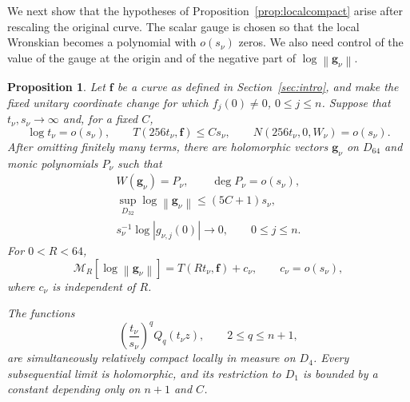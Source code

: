 \documentclass[12pt,letterpaper,reqno]{amsart}
\newtheorem{prop}[thm]{Proposition}
\theoremstyle{definition}
\numberwithin{equation}{section}
\newcommand{\NN}{N}
\newcommand{\mean}[2]{\mathcal M_{#1}\!\left[#2\right]}
\newcommand{\norm}[1]{\left\lVert#1\right\rVert}
\newcommand{\fv}{\bm f}
\newcommand{\gv}{\bm g}
\begin{document}
We next show that the hypotheses of
Proposition~\ref{prop:localcompact} arise after rescaling the original
curve. The scalar gauge is chosen so that the local Wronskian becomes a
polynomial with \(o(s_\nu)\) zeros. We also need control of the value
of the gauge at the origin and of the negative part of
\(\log\norm{\gv_\nu}\).

\begin{prop}\label{prop:representation}
Let \(\fv\) be a curve as defined in Section~\ref{sec:intro}, and make
the fixed unitary coordinate change for which
\(f_j(0)\ne0\), \(0\leq j\leq n\).
Suppose that \(t_\nu,s_\nu\to\infty\) and, for a fixed \(C\),
\begin{equation}\label{eq:scalehyp}
 \log t_\nu=o(s_\nu),
 \qquad
 T(256t_\nu,\fv)\leq Cs_\nu,
 \qquad
 \NN(256t_\nu,0,W_\nu)=o(s_\nu).
\end{equation}
After omitting finitely many terms, there are holomorphic vectors
\(\gv_\nu\) on \(D_{64}\) and monic polynomials \(P_\nu\) such that
\begin{equation}\label{eq:representationbounds}
 \begin{gathered}
 W(\gv_\nu)=P_\nu,
 \qquad
 \deg P_\nu=o(s_\nu),\\
 \sup_{D_{32}}\log\norm{\gv_\nu}
 \leq(5C+1)s_\nu,\\
 s_\nu^{-1}\log|g_{\nu,j}(0)|
 \longrightarrow0,
 \qquad
 0\leq j\leq n.
 \end{gathered}
\end{equation}
For \(0<R<64\),
\begin{equation}\label{eq:meanidentity}
 \mean R{\log\norm{\gv_\nu}}
 =
 T(Rt_\nu,\fv)+c_\nu,
 \qquad
 c_\nu=o(s_\nu),
\end{equation}
where \(c_\nu\) is independent of \(R\).

The functions
\begin{equation}\label{eq:scaledcompact}
 \left(\frac{t_\nu}{s_\nu}\right)^qQ_q(t_\nu z),
 \qquad
 2\leq q\leq n+1,
\end{equation}
are simultaneously relatively compact locally in measure on \(D_4\).
Every subsequential limit is holomorphic, and its restriction to
\(D_1\) is bounded by a constant depending only on \({n+1}\) and \(C\).
\end{prop}
\end{document}
